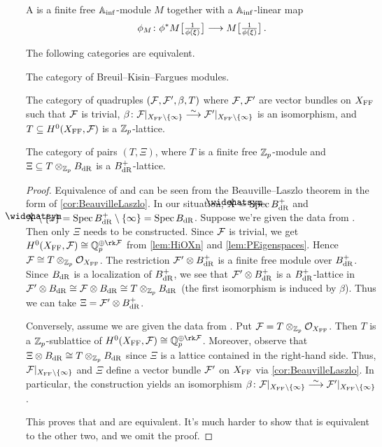 \documentclass[a4paper, 10pt, oneside, DIV=9, chapterprefix=true, numbers=enddot,bibliography=totoc]{scrbook}
\begin{document}
\begin{defi}
	A  is a finite free $\mathbb{A}_{\mathrm{inf}}$-module $M$ together with a $\mathbb{A}_{\mathrm{inf}}$-linear map
	\begin{equation*}
		\phi_M\colon \phi^*M{\localize{\phi(\xi)}}\morphism M{\localize{\phi(\xi)}}\,.
	\end{equation*}
\end{defi}
\begin{thm}[Fargues]
	The following categories are equivalent.
	\begin{numerate}
		\item The category of Breuil--Kisin--Fargues modules.
		\item The category of quadruples $(\mathcal{F},\mathcal{F}',\beta,T)$ where $\mathcal{F},\mathcal{F}'$ are vector bundles on $X_{\mathrm{FF}}$ such that $\mathcal{F}$ is trivial, $\beta\colon \Ff|_{X_\FFC\setminus \{\infty\}}\isomorphism \Ff'|_{X_\FFC\setminus \{\infty\}}$ is an isomorphism, and $T\subseteq H^0(X_{\mathrm{FF}},\mathcal{F})$ is a $\mathbb{Z}_p$-lattice.
		\item The category of pairs $(T,\Xi)$, where $T$ is a finite free $\mathbb{Z}_p$-module and $\Xi\subseteq T\otimes_{\mathbb{Z}_p}B_{\mathrm{dR}}$ is a $B_{\mathrm{dR}}^+$-lattice.
	\end{numerate}
\end{thm}
\begin{proof}
	Equivalence of  and  can be seen from the Beauville--Laszlo theorem in the form of \cref{cor:BeauvilleLaszlo}. In our situation, $\roof{X}=\Spec B_\dR^+$ and $\roof{X}\setminus \{x\}=\Spec B_\dR^+\setminus \{\infty\}=\Spec B_\dR$. Suppose we're given the data from . Then only $\Xi$ needs to be constructed. Since $\mathcal{F}$ is trivial, we get $H^0(X_\FFC,\Ff)\cong \IQ_p^{\oplus \rk \Ff}$ from \cref{lem:HiOXn} and \cref{lem:PEigenspaces}. Hence $\mathcal{F}\cong T\otimes_{\mathbb{Z}_p}\mathcal{O}_{X_{\mathrm{FF}}}$. The restriction $\mathcal{F}'\otimes B_{\mathrm{dR}}^+$ is a finite free module over $B_{\mathrm{dR}}^+$. Since $B_{\mathrm{dR}}$ is a localization of $B_{\mathrm{dR}}^+$, we see that $\mathcal{F}'\otimes B_{\mathrm{dR}}^+$ is a $B_{\mathrm{dR}}^+$-lattice in $\mathcal{F}'\otimes B_{\mathrm{dR}}\cong \mathcal{F}\otimes B_{\mathrm{dR}}\cong T\otimes_{\mathbb{Z}_p}B_{\mathrm{dR}}$ (the first isomorphism is induced by $\beta$). Thus we can take $\Xi=\mathcal{F}'\otimes B_{\mathrm{dR}}^+$.
	
	Conversely, assume we are given the data from . Put $\mathcal{F}=T\otimes_{\mathbb{Z}_p}\mathcal{O}_{X_{\mathrm{FF}}}$. Then $T$ is a $\mathbb{Z}_p$-sublattice of $H^0(X_\FFC,\Ff)\cong \IQ_p^{\oplus\rk \Ff}$. Moreover, observe that $\Xi\otimes B_{\mathrm{dR}}\cong T\otimes_{\mathbb{Z}_p}B_{\mathrm{dR}}$ since $\Xi$ is a lattice contained in the right-hand side. Thus, $\mathcal{F}|_{X_{\mathrm{FF}}\setminus \{\infty\}}$ and $\Xi$ define a vector bundle $\mathcal{F}'$ on $X_{\mathrm{FF}}$ via \cref{cor:BeauvilleLaszlo}. In particular, the construction yields an isomorphism $\beta\colon \Ff|_{X_\FFC\setminus\{\infty\}}\isomorphism \Ff'|_{X_\FFC\setminus\{\infty\}}$.
	
	This proves that  and  are equivalent. It's much harder to show that  is equivalent to the other two, and we omit the proof.
\end{proof}
\end{document}
